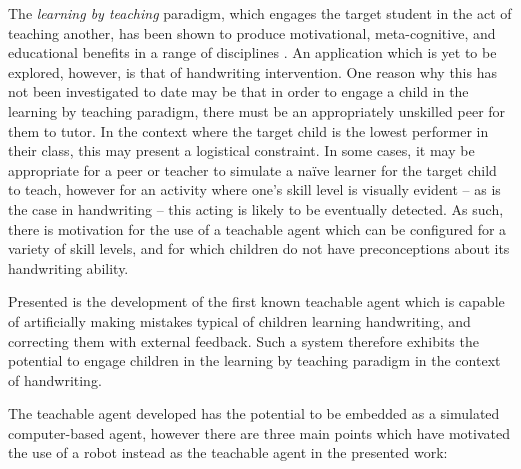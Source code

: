 \documentclass{sig-alternate}
\begin{document}
The \emph{learning by teaching} paradigm, which engages the target student in
the act of teaching another, has been shown to produce motivational,
meta-cognitive, and educational benefits in a range of disciplines
\cite{Rohrbeck2003}. An application which is yet to be explored, however, is
that of handwriting intervention. One reason why this has not been investigated
to date may be that in order to engage a child in the learning by teaching
paradigm, there must be an appropriately unskilled peer for them to tutor. In
the context where the target child is the lowest performer in their class, this
may present a logistical constraint. In some cases, it may be appropriate for a
peer or teacher to simulate a na\"ive learner for the target child to teach,
however for an activity where one's skill level is visually evident -- as is the
case in handwriting -- this acting is likely to be eventually detected. As such,
there is motivation for the use of a teachable agent which can be configured for
a variety of skill levels, and for which children do not have preconceptions
about its handwriting ability.

Presented is the development of the first known teachable agent which is capable
of artificially making mistakes typical of children learning handwriting, and
correcting them with external feedback. Such a system therefore exhibits the potential
to engage children in the learning by teaching paradigm in the context of
handwriting. 

The teachable agent developed has the potential to be embedded as a simulated 
computer-based agent, however there are three main points which have motivated 
the use of a robot instead as the teachable agent in the presented work:
\end{document}
